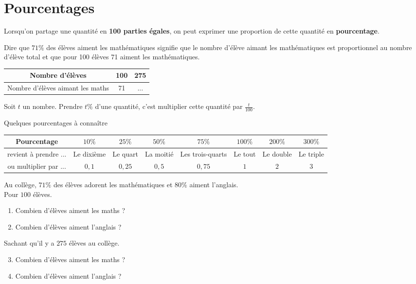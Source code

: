 \documentclass[a4paper,dvipsnames]{article}
\begin{document}
\section{Pourcentages}

\begin{Def}
Lorsqu'on partage une quantité en \textbf{100 parties égales}, on peut exprimer une proportion de cette quantité en \textbf{pourcentage}.
\end{Def}

\begin{Pp}
Dire que $71\%$ des élèves aiment les mathématiques signifie que le nombre d'élève aimant les mathématiques est proportionnel au nombre d'élève total et que pour 100 élèves 71 aiment les mathématiques.

\begin{center}
\begin{tabular}{c|c|c}
Nombre d'élèves & 100 & 275 \\\hline
Nombre d'élèves aimant les maths & 71 & ... \\
\end{tabular}
\end{center}
\end{Pp}

\begin{Pp}
Soit $t$ un nombre. Prendre $t\%$ d'une quantité, c'est multiplier cette quantité par $\frac{t}{100}$.
\end{Pp}

Quelques pourcentages à connaître
\begin{center}
\begin{tabular}{c||c|c|c|c|c|c|c}
Pourcentage & $10\%$ & $25\%$ & $50\%$ & $75\%$ & $100\%$ & $200\%$ & $300\%$ \\\hline
revient à prendre ... & Le dixième & Le quart & La moitié & Les trois-quarts & Le tout & Le double & Le triple \\\hline
ou multiplier par ... & $0,1$ & $0,25$ & $0,5$ & $0,75$ & $1$ & $2$ & $3$ \\
\end{tabular}
\end{center}

\begin{ExOApp}
Au collège, $71\%$ des élèves adorent les mathématiques et $80\%$ aiment l'anglais.\\

Pour $100$ élèves. 
\begin{enumerate}
\item Combien d'élèves aiment les maths ?
\item Combien d'élèves aiment l'anglais ?
\end{enumerate}

Sachant qu'il y a $275$ élèves au collège.
\begin{enumerate}
\setcounter{enumi}{2}
\item Combien d'élèves aiment les maths ?
\item Combien d'élèves aiment l'anglais ?
\end{enumerate}
\end{ExOApp}
\end{document}
